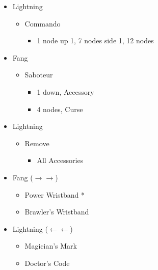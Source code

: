 	\begin{menu}
		\begin{itemize}
			\crystarium
			\begin{itemize}
				\item Lightning
				      \begin{itemize}
					      \item Commando
					            \begin{itemize}
						            \item 1 node up 1, 7 nodes side 1, 12 nodes
					            \end{itemize}
				      \end{itemize}
				\item Fang
				      \begin{itemize}
					      \item Saboteur
					            \begin{itemize}
						            \item 1 down, Accessory
						            \item 4 nodes, Curse
					            \end{itemize}
				      \end{itemize}
			\end{itemize}
			\equip
			\begin{itemize}
				\item Lightning
				      \begin{itemize}
					      \item Remove
					            \begin{itemize}
						            \item All Accessories
					            \end{itemize}
				      \end{itemize}
				\item Fang ($\rightarrow\rightarrow$)
				      \begin{itemize}
					      \item Power Wristband *
					      \item Brawler's Wristband
				      \end{itemize}
				\item Lightning ($\leftarrow\leftarrow$)
				      \begin{itemize}
					      \item Magician's Mark
					      \item Doctor's Code
				      \end{itemize}
			\end{itemize}
		\end{itemize}
	\end{menu}
			
